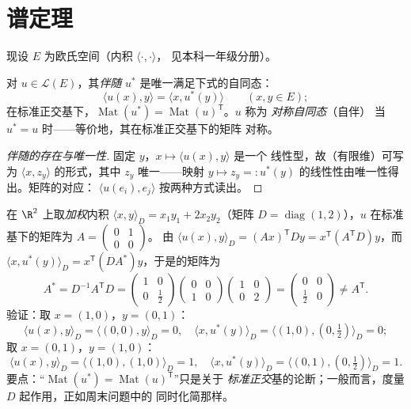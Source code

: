 \section{谱定理}

现设 $E$ 为欧氏空间（内积 $\langle\cdot,\cdot\rangle$，
见本科一年级分册）。

\begin{definition}[伴随；对称自同态]\label{def:b2:quadratic:adjoint}
对 $u \in \mathcal{L}(E)$，其\emph{伴随}
$u^*$ 是唯一满足下式的自同态：
\[
\langle u(x), y\rangle = \langle x, u^*(y)\rangle
\qquad (x, y \in E);
\]
在标准正交基下，$\operatorname{Mat}(u^*) =
\operatorname{Mat}(u)^{\mathsf T}$。$u$ 称为
\emph{对称自同态}（自伴）
当 $u^* = u$ 时——等价地，其在标准正交基下的矩阵
对称。
\end{definition}

\begin{proof}[伴随的存在与唯一性]
固定 $y$，$x \mapsto \langle u(x), y\rangle$ 是一个
线性型，故（有限维）可写为 $\langle x,
z_y\rangle$ 的形式，其中 $z_y$ 唯一——映射 $y \mapsto z_y =:
u^*(y)$ 的线性性由唯一性得出。矩阵的对应：
$\langle u(e_i), e_j\rangle$ 按两种方式读出。
\end{proof}

\begin{example}[伴随依赖于内积]\label{ex:b2:quadratic:weightedadjoint}
在 $\R^2$ 上取\emph{加权}内积 $\langle x,
y\rangle_D = x_1y_1 + 2x_2y_2$（矩阵 $D =
\operatorname{diag}(1,2)$），$u$ 在标准基下的矩阵为 $A =
\begin{pmatrix} 0 & 1\\ 0 & 0\end{pmatrix}$。
由 $\langle u(x), y\rangle_D = (Ax)^{\mathsf T}Dy =
x^{\mathsf T}(A^{\mathsf T}D)y$，而 $\langle x, u^*(y)\rangle_D
= x^{\mathsf T}(DA^*)y$，于是的矩阵为
\[
A^* = D^{-1}A^{\mathsf T}D
= \begin{pmatrix} 1 & 0\\ 0 & \tfrac12\end{pmatrix}
\begin{pmatrix} 0 & 0\\ 1 & 0\end{pmatrix}
\begin{pmatrix} 1 & 0\\ 0 & 2\end{pmatrix}
= \begin{pmatrix} 0 & 0\\ \tfrac12 & 0\end{pmatrix}
\neq A^{\mathsf T} .
\]
验证：取 $x = (1,0)$，$y = (0,1)$：
\[
\langle u(x), y\rangle_D = \langle (0,0), y\rangle_D = 0,
\quad
\langle x, u^*(y)\rangle_D
= \langle(1,0), (0,\tfrac12)\rangle_D = 0 ;
\]
取 $x = (0,1)$，$y = (1,0)$：
\[
\langle u(x), y\rangle_D = \langle(1,0),(1,0)\rangle_D = 1,
\quad
\langle x, u^*(y)\rangle_D =
\langle(0,1),(0,\tfrac12)\rangle_D = 1 .
\] 要点：“$\operatorname{Mat}(u^*)
= \operatorname{Mat}(u)^{\mathsf T}$”只是关于
\emph{标准正交}基的论断；一般而言，度量 $D$
起作用，正如周末问题中的
同时化简那样。
\end{example}

